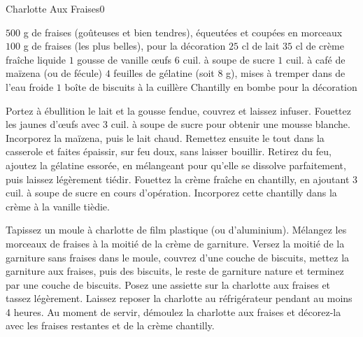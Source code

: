 \begin{recette}{Charlotte Aux Fraises}{0}{}{}
\begin{ingredients}[6 pers.]
\ingredient $500$ g de fraises (goûteuses et bien tendres), équeutées et coupées en morceaux
\ingredient $100$ g de fraises (les plus belles), pour la décoration
\ingredient $25$ cl de lait
\ingredient $35$ cl de crème fraîche liquide
\ingredient $1$ gousse de vanille
 œufs
\ingredient $6$ cuil. à soupe de sucre
\ingredient $1$ cuil. à café de maïzena (ou de fécule)
\ingredient $4$ feuilles de gélatine (soit 8 g), mises à tremper dans de l'eau froide
\ingredient $1$ boîte de biscuits à la cuillère
\ingredient Chantilly en bombe pour la décoration
\end{ingredients}

\begin{preparation}
\etape Portez à ébullition le lait et la gousse fendue, couvrez et laissez infuser.
\etape Fouettez les jaunes d'œufs avec 3 cuil. à soupe de sucre pour obtenir une mousse blanche.
\etape Incorporez la maïzena, puis le lait chaud.
\etape Remettez ensuite le tout dans la casserole et faites épaissir, sur feu doux, sans laisser bouillir.
\etape Retirez du feu, ajoutez la gélatine essorée, en mélangeant pour qu'elle se dissolve parfaitement, puis laissez légèrement tiédir.
\etape Fouettez la crème fraîche en chantilly, en ajoutant 3 cuil. à soupe de sucre en cours d'opération.
\etape Incorporez cette chantilly dans la crème à la vanille tièdie.

\etape Tapissez un moule à charlotte de film plastique (ou d'aluminium).
\etape Mélangez les morceaux de fraises à la moitié de la crème de garniture.
\etape Versez la moitié de la garniture sans fraises dans le moule, couvrez d'une couche de biscuits, mettez la garniture aux fraises, puis des biscuits, le reste de garniture nature et terminez par une couche de biscuits.
\etape Posez une assiette sur la charlotte aux fraises et tassez légèrement.
\etape Laissez reposer la charlotte au réfrigérateur pendant au moins 4 heures.
\etape Au moment de servir, démoulez la charlotte aux fraises et décorez-la avec les fraises restantes et de la crème chantilly.
\end{preparation}

\end{recette}

